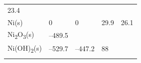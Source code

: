 \documentclass[
  9pt,
]{extbook}
\theoremstyle{definition}
\theoremstyle{definition}
\theoremstyle{definition}
\theoremstyle{remark}
\begin{document}
\begin{longtable}[]{@{}lllll@{}}
\begin{minipage}[t]{0.18\columnwidth}
23.4\strut
\end{minipage}\tabularnewline
\begin{minipage}[t]{0.10\columnwidth}\raggedright
Ni(s)\strut
\end{minipage} & \begin{minipage}[t]{0.19\columnwidth}\raggedright
0\strut
\end{minipage} & \begin{minipage}[t]{0.20\columnwidth}\raggedright
0\strut
\end{minipage} & \begin{minipage}[t]{0.18\columnwidth}\raggedright
29.9\strut
\end{minipage} & \begin{minipage}[t]{0.18\columnwidth}\raggedright
26.1\strut
\end{minipage}\tabularnewline
\begin{minipage}[t]{0.10\columnwidth}\raggedright
Ni\textsubscript{2}O\textsubscript{3}(s)\strut
\end{minipage} & \begin{minipage}[t]{0.19\columnwidth}\raggedright
--489.5\strut
\end{minipage} & \begin{minipage}[t]{0.20\columnwidth}\raggedright
\strut
\end{minipage} & \begin{minipage}[t]{0.18\columnwidth}\raggedright
\strut
\end{minipage} & \begin{minipage}[t]{0.18\columnwidth}\raggedright
\strut
\end{minipage}\tabularnewline
\begin{minipage}[t]{0.10\columnwidth}\raggedright
Ni(OH)\textsubscript{2}(s)\strut
\end{minipage} & \begin{minipage}[t]{0.19\columnwidth}\raggedright
--529.7\strut
\end{minipage} & \begin{minipage}[t]{0.20\columnwidth}\raggedright
--447.2\strut
\end{minipage} & \begin{minipage}[t]{0.18\columnwidth}\raggedright
88\strut
\end{minipage} & \begin{minipage}[t]{0.18\columnwidth}\raggedright
\strut
\end{minipage}\tabularnewline
\begin{minipage}[t]{0.10\columnwidth}\raggedright

\end{minipage}
\end{longtable}
\end{document}

